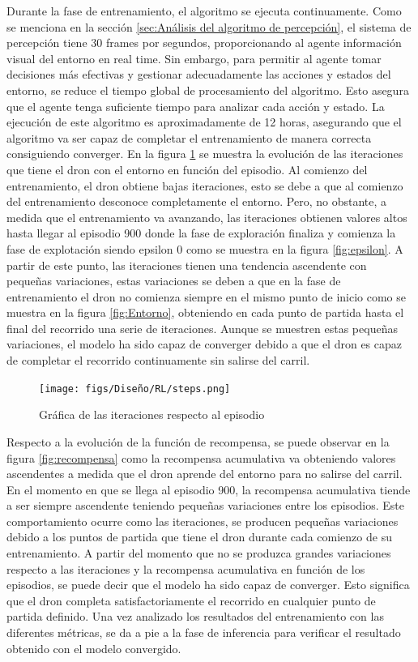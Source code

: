 Durante la fase de entrenamiento, el algoritmo se ejecuta continuamente. Como se menciona en la sección \ref{sec:Análisis del algoritmo de percepción}, el sistema de percepción tiene 30 frames por
segundos, proporcionando al agente información visual del entorno en real time. Sin embargo, para permitir al agente tomar decisiones más efectivas y gestionar adecuadamente las acciones 
y estados del entorno, se reduce el tiempo global de procesamiento del algoritmo. Esto asegura que el agente tenga suficiente tiempo para analizar cada acción y estado. La ejecución de este 
algoritmo es aproximadamente de 12 horas, asegurando que el algoritmo va ser capaz de completar el entrenamiento de manera correcta consiguiendo converger. En la figura \ref{fig:iteraciones} 
se muestra la evolución de las iteraciones que tiene el dron con el entorno en función del episodio. Al comienzo del entrenamiento, el dron obtiene bajas iteraciones, esto se debe a que 
al comienzo del entrenamiento desconoce completamente el entorno. Pero, no obstante, a medida que el entrenamiento va avanzando, las iteraciones obtienen valores altos hasta llegar al episodio
900 donde la fase de exploración finaliza y comienza la fase de explotación siendo epsilon 0 como se muestra en la figura \ref{fig:epsilon}. A partir de este punto, las iteraciones tienen 
una tendencia ascendente con pequeñas variaciones, estas variaciones se deben a que en la fase de entrenamiento el dron no comienza siempre en el mismo punto de inicio como 
se muestra en la figura \ref{fig:Entorno}, obteniendo en cada punto de partida hasta el final del recorrido una serie de iteraciones. Aunque se muestren estas pequeñas variaciones, el modelo
ha sido capaz de converger debido a que el dron es capaz de completar el recorrido continuamente sin salirse del carril.

\begin{figure} [H]
  \begin{center}
    \texttt{[image: figs/Diseño/RL/steps.png]}
  \end{center}
  \caption{Gráfica de las iteraciones respecto al episodio}
  \label{fig:iteraciones}
\end{figure}

Respecto a la evolución de la función de recompensa, se puede observar en la figura \ref{fig:recompensa} como la recompensa acumulativa va obteniendo valores ascendentes a medida que el dron 
aprende del entorno para no salirse del carril. En el momento en que se llega al episodio 900, la recompensa acumulativa tiende a ser siempre ascendente teniendo pequeñas variaciones entre los 
episodios. Este comportamiento ocurre como las iteraciones, se producen pequeñas variaciones debido a los puntos de partida que tiene el dron durante cada comienzo de su entrenamiento. A partir 
del momento 
que no se produzca grandes variaciones respecto a las iteraciones y la recompensa acumulativa en función de los episodios, se puede decir que el modelo ha sido capaz de converger. Esto significa
que el dron completa satisfactoriamente el recorrido en cualquier punto de partida definido. Una vez analizado los resultados del entrenamiento con las diferentes métricas, se da a pie a la 
fase de inferencia para verificar el resultado obtenido con el modelo convergido.


